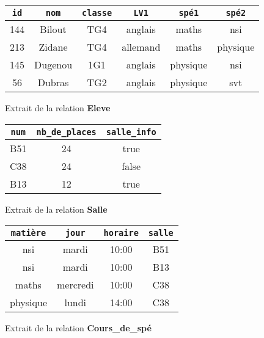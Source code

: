 \documentclass[11pt,a4paper,french,twoside]{PMCours}
\begin{document}
\begin{figure}[h]
\begin{center}
\begin{tabular}[c]{|c|c|c|c|c|c|}\hline
\verb'id' & \verb'nom' & \verb'classe' & \verb'LV1' & \verb'spé1' & \verb'spé2'\\\hline
144 & Bilout & TG4 & anglais & maths & nsi\\\hline
213 & Zidane & TG4 & allemand & maths & physique\\\hline
145 & Dugenou & 1G1 & anglais & physique & nsi\\\hline
56 & Dubras & TG2 & anglais & physique & svt\\\hline
\end{tabular}
\end{center}
\caption{Extrait de la relation \textbf{Eleve}}
\end{figure}

\begin{figure}[h]
\begin{center}
\begin{tabular}[c]{|c|c|c|}\hline
\verb'num' & \verb'nb_de_places' & \verb'salle_info'  \\\hline
B51 & 24 & true  \\\hline
C38 & 24 & false   \\\hline
B13 & 12 & true   \\\hline
\end{tabular}
\end{center}
\caption{Extrait de la relation \textbf{Salle}}
\end{figure}

\begin{figure}[h]
\begin{center}
\begin{tabular}[c]{|c|c|c|c|}\hline
\verb'matière' & \verb'jour' & \verb'horaire' & \verb'salle'  \\\hline
nsi & mardi & 10:00 & B51  \\\hline
nsi & mardi & 10:00 & B13  \\\hline
maths & mercredi & 10:00 & C38  \\\hline
physique & lundi & 14:00 & C38  \\\hline
\end{tabular}
\end{center}
\caption{Extrait de la relation \textbf{Cours\_de\_spé}}
\end{figure}
\end{document}
